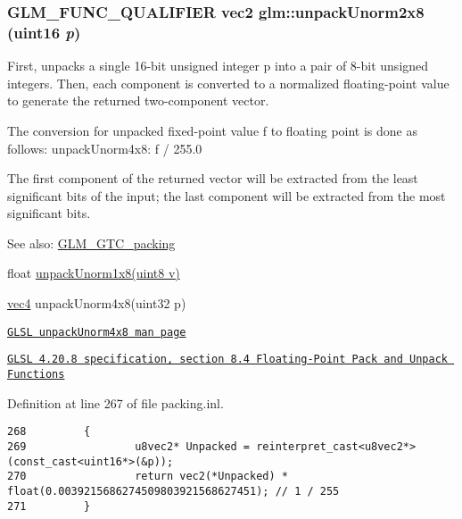 \hypertarget{group__gtc__packing_g96ce0c24339ee676e28a027fffd1edf6}{
\subsubsection[unpackUnorm2x8]{\setlength{\rightskip}{0pt plus 5cm}GLM\_\-FUNC\_\-QUALIFIER vec2 glm::unpackUnorm2x8 (uint16 {\em p})}}
\label{group__gtc__packing_g96ce0c24339ee676e28a027fffd1edf6}


First, unpacks a single 16-bit unsigned integer p into a pair of 8-bit unsigned integers. Then, each component is converted to a normalized floating-point value to generate the returned two-component vector.

The conversion for unpacked fixed-point value f to floating point is done as follows: unpackUnorm4x8: f / 255.0

The first component of the returned vector will be extracted from the least significant bits of the input; the last component will be extracted from the most significant bits.

\begin{Desc}
\item[See also:]\hyperlink{group__gtc__packing}{GLM\_\-GTC\_\-packing} 

float \hyperlink{group__gtc__packing_g32f3f2642df2ea87449d59fb614a8305}{unpackUnorm1x8(uint8 v)} 

\hyperlink{group__core__types_g5881b1b022d7fd1b7218f5916532dd02}{vec4} unpackUnorm4x8(uint32 p) 

\href{http://www.opengl.org/sdk/docs/manglsl/xhtml/unpackUnorm4x8.xml}{\tt GLSL unpackUnorm4x8 man page} 

\href{http://www.opengl.org/registry/doc/GLSLangSpec.4.20.8.pdf}{\tt GLSL 4.20.8 specification, section 8.4 Floating-Point Pack and Unpack Functions} \end{Desc}


Definition at line 267 of file packing.inl.

\begin{Code}\begin{verbatim}268         {
269                 u8vec2* Unpacked = reinterpret_cast<u8vec2*>(const_cast<uint16*>(&p));
270                 return vec2(*Unpacked) * float(0.0039215686274509803921568627451); // 1 / 255
271         }
\end{verbatim}
\end{Code}


